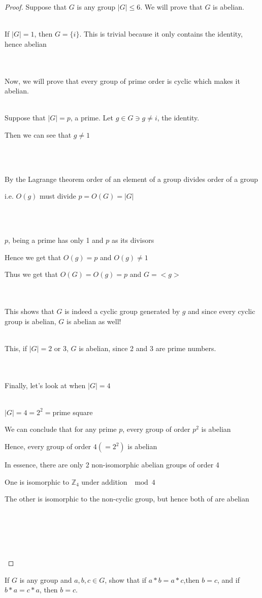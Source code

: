 \documentclass[12pt]{article}
\newenvironment{problem}[2][Problem]{\begin{trivlist}
\item[\hskip \labelsep {\bfseries #1}\hskip \labelsep {\bfseries #2.}]}{\end{trivlist}}
\begin{document}
\begin{proof}
Suppose that $G$ is any group $|G| \leq 6$. We will prove that $G$ is abelian. \\ \\
\centerline{If $|G|=1$, then $G=\{i\}$. This is trivial because it only contains the identity, hence abelian} \\ \\
Now, we will prove that every group of prime order is cyclic which makes it abelian.  \\ \\
\centerline{Suppose that $|G| = p$, a prime. Let $g \in G \ni g \neq i$, the identity.}
\centerline{Then we can see that $g \neq 1$}\\ \\
\centerline{By the Lagrange theorem order of an element of a group divides order of a group}
\centerline{i.e. $O(g)$ must divide $p=O(G)=|G|$} \\ \\ 
\centerline{$p$, being a prime has only 1 and $p$ as its divisors}
\centerline{Hence we get that $O(g) = p$ and $O(g) \neq 1$}
\centerline{Thus we get that $O(G) = O(g) = p$ and $G = <g>$} \\ \\
This shows that $G$ is indeed a cyclic group generated by $g$ and since every cyclic group is abelian, $G$ is abelian as well! \\ \\
\centerline{This, if $|G| = 2$ or $3$, $G$ is abelian, since 2 and 3 are prime numbers.} \\ \\
Finally, let's look at when $|G| = 4$ \\ \\
\centerline{$|G|=4 =2^2=$prime square}
\centerline{We can conclude that for any prime $p$, every group of order $p^2$ is abelian}
\centerline{Hence, every group of order $4(=2^2)$ is abelian}
\centerline{In essence, there are only 2 non-isomorphic abelian groups of order 4}
\centerline{One is isomorphic to $\mathbb{Z}_4$ under addition $\mod 4$}
\centerline{The other is isomorphic to the non-cyclic group, but hence both of are abelian} \\ \\
\centerline{} \\ \\
\end{proof}
 
 \begin{problem}{2.1.14}
If $G$ is any group and $a,b,c \in G$, show that if $a*b=a*c$,then $b=c$, and if $b*a=c*a$, then $b=c$.
\end{problem}
\end{document}
